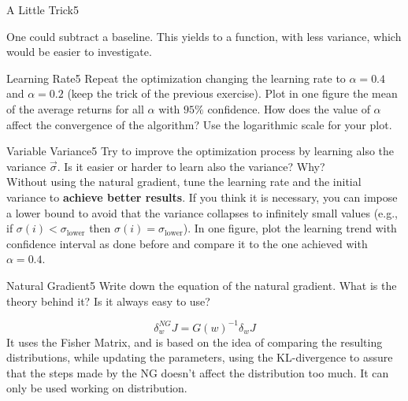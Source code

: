 \begin{questions}
\begin{question}{A Little Trick}{5}
\begin{answer}
One could subtract a baseline. This yields to a function, with less variance, which would be easier to investigate.
\end{answer}
\end{question}
	


\begin{question}{Learning Rate}{5}
	Repeat the optimization changing the learning rate to $\alpha=0.4$ and $\alpha = 0.2$ (keep the trick of the previous exercise).
	Plot in one figure the mean of the average returns for all $\alpha$ with $95\%$ confidence.
	How does the value of $\alpha$ affect the convergence of the algorithm? 
	Use the logarithmic scale for your plot.
		
\begin{answer}\end{answer}
\end{question}

	
\begin{question}{Variable Variance}{5}
	Try to improve the optimization process by learning also the variance $\vec \sigma$. Is it easier or harder to learn also the variance? Why?
	\\Without using the natural gradient, tune the learning rate and the initial variance to \textbf{achieve better results}. If you think it is necessary, you can impose a lower bound to avoid that the variance collapses to infinitely small values (e.g., if $\sigma(i)<\sigma_{\text{lower}}$ then $\sigma(i) = \sigma_{\text{lower}}$).
	In one figure, plot the learning trend with confidence interval as done before and compare it to the one achieved with $\alpha = 0.4$.
	
\begin{answer}\end{answer}
\end{question}


	
\begin{question}[bonus]{Natural Gradient}{5}
	Write down the equation of the natural gradient. What is the theory behind it?
	Is it always easy to use?
	
\begin{answer}
	\begin{equation}	
		\delta^{NG}_w J = G(w)^{-1}\delta_wJ 
	\end{equation}
	It uses the Fisher Matrix, and is based on the idea of comparing the resulting distributions, while updating the parameters, using the KL-divergence to assure that the steps made by the NG doesn't affect the distribution too much.
	It can only be used working on distribution.

\end{answer}
\end{question}

\end{questions}